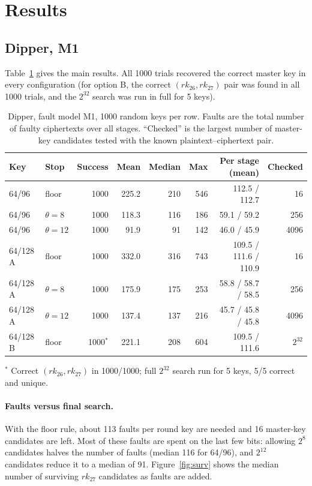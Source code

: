 \documentclass[11pt,a4paper]{article}
\newcommand{\rk}{\mathit{rk}}
\begin{document}
\section{Results}

\subsection{Dipper, M1}

Table~\ref{tab:main} gives the main results. All 1000 trials recovered the correct master key
in every configuration (for option B, the correct $(\rk_{26},\rk_{27})$ pair was found in all
1000 trials, and the $2^{32}$ search was run in full for 5 keys).

\begin{table}[t]
\centering
\caption{Dipper, fault model M1, 1000 random keys per row. Faults are the total number of
faulty ciphertexts over all stages. ``Checked'' is the largest number of master-key candidates
tested with the known plaintext--ciphertext pair.}
\label{tab:main}
\small
\begin{tabular}{llrrrrrr}
\toprule
Key & Stop & Success & Mean & Median & Max & Per stage (mean) & Checked\\
\midrule
64/96 & floor & 1000 & 225.2 & 210 & 546 & 112.5 / 112.7 & 16\\
64/96 & $\theta=8$ & 1000 & 118.3 & 116 & 186 & 59.1 / 59.2 & 256\\
64/96 & $\theta=12$ & 1000 & 91.9 & 91 & 142 & 46.0 / 45.9 & 4096\\
\midrule
64/128 A & floor & 1000 & 332.0 & 316 & 743 & 109.5 / 111.6 / 110.9 & 16\\
64/128 A & $\theta=8$ & 1000 & 175.9 & 175 & 253 & 58.8 / 58.7 / 58.5 & 256\\
64/128 A & $\theta=12$ & 1000 & 137.4 & 137 & 216 & 45.7 / 45.8 / 45.8 & 4096\\
\midrule
64/128 B & floor & 1000$^{*}$ & 221.1 & 208 & 604 & 109.5 / 111.6 & $2^{32}$\\
\bottomrule
\end{tabular}

\smallskip
\raggedright\footnotesize $^{*}$ Correct $(\rk_{26},\rk_{27})$ in 1000/1000; full $2^{32}$ search run for 5 keys, 5/5 correct and unique.
\end{table}

\paragraph{Faults versus final search.} With the floor rule, about 113 faults per round key are
needed and 16 master-key candidates are left. Most of these faults are spent on the last few
bits: allowing $2^{8}$ candidates halves the number of faults (median 116 for 64/96), and
$2^{12}$ candidates reduce it to a median of 91. Figure~\ref{fig:surv} shows the median number of
surviving $\rk_{27}$ candidates as faults are added.
\end{document}
